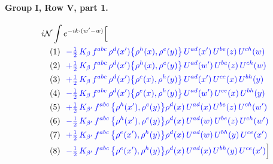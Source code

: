\documentclass[10pt]{article}
\numberwithin{equation}{section}
\newcommand{\NN}{\mathcal N}
\begin{document}
\paragraph{Group I, Row V, part 1.}
\begin{align*}
&i\NN\int e^{-ik\cdot(w'-w)}\Big[\\
&\quad\text{(1)}\ \ \textcolor{blue}{- \tfrac12\,K_{\beta}\,f^{abc}\,\rho^{d}(x')\big\{\rho^{h}(x),\rho^{e}(y)\big\}\,U^{ad}(x')\,U^{be}(z)\,U^{ch}(w)}\\
&\quad\text{(2)}\ \ \textcolor{blue}{+\tfrac12\,K_{\beta}\,f^{abc}\,\rho^{d}(x')\big\{\rho^{h}(x),\rho^{e}(y)\big\}\,U^{ad}(w')\,U^{be}(z)\,U^{ch}(w)}\\
&\quad\text{(3)}\ \ \textcolor{blue}{+\tfrac12\,K_{\beta}\,f^{abc}\,\rho^{d}(x')\big\{\rho^{e}(x),\rho^{h}(y)\big\}\,U^{ad}(x')\,U^{ce}(x)\,U^{bh}(y)}\\
&\quad\text{(4)}\ \ \textcolor{blue}{- \tfrac12\,K_{\beta}\,f^{abc}\,\rho^{d}(x')\big\{\rho^{e}(x),\rho^{h}(y)\big\}\,U^{ad}(w')\,U^{ce}(x)\,U^{bh}(y)}\\
&\quad\text{(5)}\ \ \textcolor{blue}{+\tfrac12\,K_{\beta'}\,f^{abc}\,\big\{\rho^{h}(x'),\rho^{e}(y)\big\}\rho^{d}(x)\,U^{ad}(x)\,U^{be}(z)\,U^{ch}(w')}\\
&\quad\text{(6)}\ \ \textcolor{blue}{- \tfrac12\,K_{\beta'}\,f^{abc}\,\big\{\rho^{h}(x'),\rho^{e}(y)\big\}\rho^{d}(x)\,U^{ad}(w)\,U^{be}(z)\,U^{ch}(w')}\\
&\quad\text{(7)}\ \ \textcolor{blue}{+\tfrac12\,K_{\beta'}\,f^{abc}\,\big\{\rho^{e}(x'),\rho^{h}(y)\big\}\rho^{d}(x)\,U^{ad}(w)\,U^{bh}(y)\,U^{ce}(x')}\\
&\quad\text{(8)}\ \ \textcolor{blue}{- \tfrac12\,K_{\beta'}\,f^{abc}\,\big\{\rho^{e}(x'),\rho^{h}(y)\big\}\rho^{d}(x)\,U^{ad}(x)\,U^{bh}(y)\,U^{ce}(x')}\Big]
\end{align*}
\end{document}
